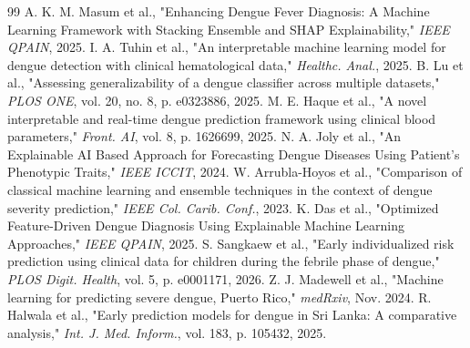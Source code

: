 \documentclass[conference]{IEEEtran}
\begin{document}
\begin{thebibliography}{99}
 A. K. M. Masum et al., "Enhancing Dengue Fever Diagnosis: A Machine Learning Framework with Stacking Ensemble and SHAP Explainability," \textit{IEEE QPAIN}, 2025.
 I. A. Tuhin et al., "An interpretable machine learning model for dengue detection with clinical hematological data," \textit{Healthc. Anal.}, 2025.
 B. Lu et al., "Assessing generalizability of a dengue classifier across multiple datasets," \textit{PLOS ONE}, vol. 20, no. 8, p. e0323886, 2025.
 M. E. Haque et al., "A novel interpretable and real-time dengue prediction framework using clinical blood parameters," \textit{Front. AI}, vol. 8, p. 1626699, 2025.
 N. A. Joly et al., "An Explainable AI Based Approach for Forecasting Dengue Diseases Using Patient's Phenotypic Traits," \textit{IEEE ICCIT}, 2024.
 W. Arrubla-Hoyos et al., "Comparison of classical machine learning and ensemble techniques in the context of dengue severity prediction," \textit{IEEE Col. Carib. Conf.}, 2023.
 K. Das et al., "Optimized Feature-Driven Dengue Diagnosis Using Explainable Machine Learning Approaches," \textit{IEEE QPAIN}, 2025.
 S. Sangkaew et al., "Early individualized risk prediction using clinical data for children during the febrile phase of dengue," \textit{PLOS Digit. Health}, vol. 5, p. e0001171, 2026.
 Z. J. Madewell et al., "Machine learning for predicting severe dengue, Puerto Rico," \textit{medRxiv}, Nov. 2024.
 R. Halwala et al., "Early prediction models for dengue in Sri Lanka: A comparative analysis," \textit{Int. J. Med. Inform.}, vol. 183, p. 105432, 2025.
\end{thebibliography}
\end{document}

